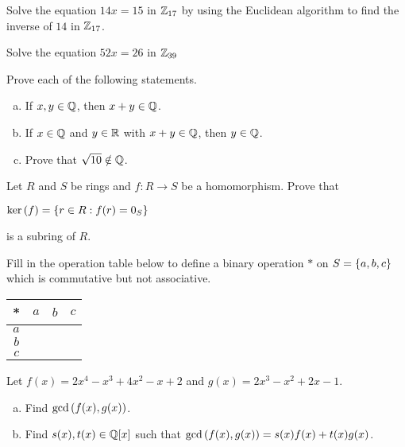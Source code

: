 \documentclass[11pt]{exam}
\begin{document}
\begin{questions}
\question[3] Solve the equation $14x = 15$ in $\mathbb{Z}_{17}$ by using the Euclidean algorithm to find the inverse of $14$ in $\mathbb{Z}_{17}$.
\vfill

\question[3] Solve the equation $52x = 26$ in $\mathbb{Z}_{39}$
\vfill

\newpage

\question[5] Prove each of the following statements.
\begin{enumerate}[(a)]
\item If $x,y\in\mathbb{Q}$, then $x+y\in\mathbb{Q}$.
\vfill

\item If $x\in \mathbb{Q}$ and $y\in\mathbb{R}$ with $x+y\in\mathbb{Q}$, then $y\in\mathbb{Q}$.
\vfill

\item Prove that $\sqrt{10}\notin\mathbb{Q}$.
\vfill

\end{enumerate}
\newpage

\question[3] Let $R$ and $S$ be rings and $f:R\to S$ be a homomorphism.  Prove that
\begin{center}
$\text{ker}\left(f\right) = \left\{r\in R:f(r) = 0_{S}\right\}$
\end{center}
is a subring of $R$.
\vfill

\question[2] Fill in the operation table below to define a binary operation $*$ on $S = \left\{a,b,c\right\}$ which is commutative but not associative.
\bgroup
\begin{center}
\def\arraystretch{1.5}
\begin{tabular}{c|ccc}
* & $a$ & $b$ & $c$\\
\hline
$a$ &\\
$b$ &\\
$c$ &\\
\end{tabular}
\end{center}
\egroup

\newpage

\question[5] Let $f(x) = 2x^4 - x^3 + 4x^2 - x + 2$ and $g(x) = 2x^3 - x^2 + 2x - 1$.
\begin{enumerate}[(a)]
\item Find $\text{gcd}\left(f(x),g(x)\right)$.
\vfill

\item Find $s(x),t(x)\in\mathbb{Q}[x]$ such that $\text{gcd}\left(f(x),g(x)\right) = s(x)f(x) + t(x)g(x)$.
\vfill
\end{enumerate}


\end{questions}
\end{document}
